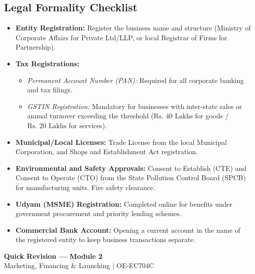 \documentclass[12pt,a4paper]{article}
\begin{document}
\subsection{Legal Formality Checklist}
\begin{itemize}[leftmargin=*, itemsep=3.5pt]
  \item \textbf{Entity Registration:} Register the business name and structure (Ministry of Corporate Affairs for Private Ltd/LLP, or local Registrar of Firms for Partnership).
  \item \textbf{Tax Registrations:}
    \begin{itemize}[label=\tiny$\bullet$, leftmargin=1.5em, itemsep=2.0pt]
      \item \textit{Permanent Account Number (PAN):} Required for all corporate banking and tax filings.
      \item \textit{GSTIN Registration:} Mandatory for businesses with inter-state sales or annual turnover exceeding the threshold ($\text{Rs. } 40 \text{ Lakhs}$ for goods / $\text{Rs. } 20 \text{ Lakhs}$ for services).
    \end{itemize}
  \item \textbf{Municipal/Local Licenses:} Trade License from the local Municipal Corporation, and Shops and Establishment Act registration.
  \item \textbf{Environmental and Safety Approvals:} Consent to Establish (CTE) and Consent to Operate (CTO) from the State Pollution Control Board (SPCB) for manufacturing units. Fire safety clearance.
  \item \textbf{Udyam (MSME) Registration:} Completed online for benefits under government procurement and priority lending schemes.
  \item \textbf{Commercial Bank Account:} Opening a current account in the name of the registered entity to keep business transactions separate.
\end{itemize}

\newpage

\begin{center}
  {\large\bfseries\color{myred} Quick Revision --- Module 2}\\[3pt]
  {\small\color{mydark} Marketing, Financing \& Launching $|$ OE-EC704C}
\end{center}
\noindent{\color{myred}\rule{\linewidth}{1.2pt}}
\vspace{4pt}
\end{document}
